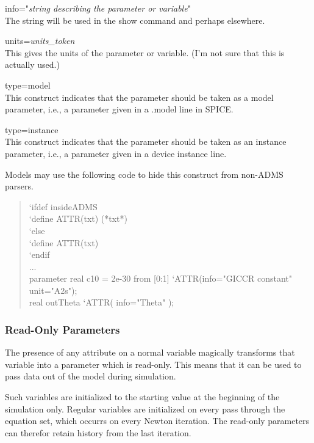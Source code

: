 \begin{description}
\item{\vt info=}"{\it string describing the parameter or variable}"\\
The string will be used in the {\WRspice} {\cb show} command and
perhaps elsewhere.

\item{\vt units=}{\it units\_token}\\
This gives the units of the parameter or variable.  (I'm not sure that
this is actually used.)

\item{\vt type=model}\\
This construct indicates that the parameter should be taken as a model
parameter, i.e., a parameter given in a {\vt .model} line in SPICE.

\item{\vt type=instance}\\
This construct indicates that the parameter should be taken as an
instance parameter, i.e., a parameter given in a device instance line.
\end{description}

Models may use the following code to hide this construct from non-ADMS
parsers.
\begin{quote}\vt
`ifdef insideADMS\\
\hspace*{2em}`define ATTR(txt) (*txt*)\\
`else\\
\hspace*{2em}`define ATTR(txt)\\
`endif\\
...\\
parameter real c10 = 2e-30 from [0:1] `ATTR(info="GICCR constant" unit="A2s");\\
real outTheta   `ATTR( info="Theta" );
\end{quote}

\subsubsection{Read-Only Parameters}

The presence of any attribute on a normal variable magically
transforms that variable into a parameter which is read-only.  This
means that it can be used to pass data out of the model during
simulation.

Such variables are initialized to the starting value at the beginning
of the simulation only.  Regular variables are initialized on every
pass through the equation set, which occurrs on every Newton
iteration.  The read-only parameters can therefor retain history from
the last iteration.

